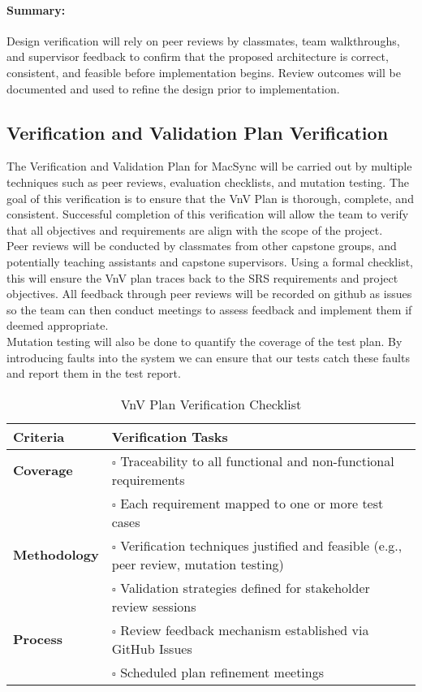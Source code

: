 \documentclass[12pt, titlepage]{article}
\begin{document}
\paragraph{Summary:}
Design verification will rely on peer reviews by classmates, team walkthroughs, and supervisor feedback to confirm that the proposed architecture is correct, consistent, and feasible before implementation begins. Review outcomes will be documented and used to refine the design prior to implementation.

\subsection{Verification and Validation Plan Verification}

The Verification and Validation Plan for MacSync will be carried out by multiple techniques such as peer reviews, evaluation checklists, and mutation testing. The goal of this verification is to ensure that the VnV Plan is thorough, complete, and consistent. Successful completion of this verification will allow the team to verify that all objectives and requirements are align with the scope of the project.\\

Peer reviews will be conducted by classmates from other capstone groups, and potentially teaching assistants and capstone supervisors. Using a formal checklist, this will ensure the VnV plan traces back to the SRS requirements and project objectives. All feedback through peer reviews will be recorded on github as issues so the team can then conduct meetings to assess feedback and implement them if deemed appropriate.\\

Mutation testing will also be done to quantify the coverage of the test plan. By introducing faults into the system we can ensure that our tests catch these faults and report them in the test report.

\begin{table}[H]
\centering
\caption{VnV Plan Verification Checklist}
\begin{tabular}{p{4cm}p{10cm}}
\toprule
\textbf{Criteria} & \textbf{Verification Tasks} \\
\midrule
\textbf{Coverage} &
$\square$ Traceability to all functional and non-functional requirements \\
& $\square$ Each requirement mapped to one or more test cases \\[0.5em]
\hline
\textbf{Methodology} &
$\square$ Verification techniques justified and feasible (e.g., peer review, mutation testing) \\
& $\square$ Validation strategies defined for stakeholder review sessions \\[0.5em]
\hline
\textbf{Process} &
$\square$ Review feedback mechanism established via GitHub Issues \\
& $\square$ Scheduled plan refinement meetings \\[0.5em]
\bottomrule
\end{tabular}
\end{table}
\end{document}
